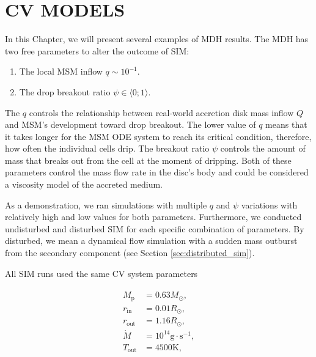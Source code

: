 \chapter{CV MODELS}
\label{chap:cv_models}
\thispagestyle{empty}

    In this Chapter, we will present several examples of MDH results. The MDH has two free parameters to alter the outcome of SIM: 

    \begin{enumerate}
        \item The local MSM inflow $q \sim 10^{-1}$.
        \item The drop breakout ratio $\psi \in \langle 0; 1 \rangle$.
    \end{enumerate}

    The $q$ controls the relationship between real-world accretion disk mass inflow $Q$ and MSM's development toward drop breakout. The lower value of $q$ means that it takes longer for the MSM ODE system to reach its critical condition, therefore, how often the individual cells drip. The breakout ratio $\psi$ controls the amount of mass that breaks out from the cell at the moment of dripping. Both of these parameters control the mass flow rate in the disc's body and could be considered a viscosity model of the accreted medium. 

    As a demonstration, we ran simulations with multiple $q$ and $\psi$ variations with relatively high and low values for both parameters. Furthermore, we conducted undisturbed and disturbed SIM for each specific combination of parameters. By disturbed, we mean a dynamical flow simulation with a sudden mass outburst from the secondary component (see Section \ref{sec:distributed_sim}).

    All SIM runs used the same CV system parameters

    \begin{align}
    \begin{split}
        M_{\mathrm{p}} &= 0.63 M_{\odot}, \\
        r_{\mathrm{in}} &= 0.01 R_{\odot}, \\
        r_{\mathrm{out}} &= 1.16 R_{\odot}, \\
        \dot{M} &= 10^{14} \si{\gram \cdot \second^{-1}}, \\
        T_{\mathrm{out}} &= 4500 \si{\kelvin},
    \end{split}
    \end{align}

